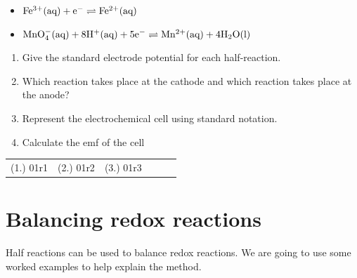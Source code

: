 {\begin{enumerate}
	\begin{itemize}
	\item{$\rm{Fe^{3+}(aq) + e^{-} \rightleftharpoons Fe^{2+}(aq)}$}
	\item{$\rm{MnO_{4}^{-}(aq) + 8H^{+}(aq) + 5e^{-} \rightleftharpoons Mn^{2+}(aq) + 4H_{2}O(l)}$}
	\end{itemize}

	\begin{enumerate}
	\item{Give the standard electrode potential for each half-reaction.}
	\item{Which reaction takes place at the cathode and which reaction takes place at the anode?}
	\item{Represent the electrochemical cell using standard notation.}
	\item{Calculate the emf of the cell}
	\end{enumerate}

\end{enumerate}

\par \practiceinfo
\par \begin{tabular}[h]{cccccc}
(1.)	01r1	&
(2.)	01r2	&
(3.)	01r3	&
\end{tabular}

}






\section{Balancing redox reactions}
\label{sec:electrochemical:balancing}

Half reactions can be used to balance redox reactions. We are going to use some worked examples to help explain the method.

